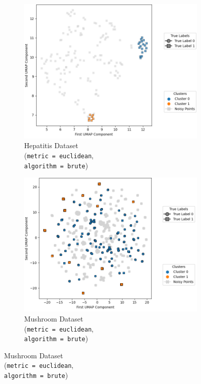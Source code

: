 \begin{figure}[H]
	\centering
	\begin{subfigure}{0.32\textwidth}
		\centering
		\includegraphics[width=\linewidth]{figures/Optics/hepatitis/br-umap.png}
		\caption{Hepatitis Dataset \\ (\texttt{metric = euclidean}, \\ \texttt{algorithm = brute})}
	\end{subfigure}
	\hfill
	\begin{subfigure}{0.32\textwidth}
		\centering
		\includegraphics[width=\linewidth]{figures/Optics/mushroom/br-umap.png}
		\caption{Mushroom Dataset \\ (\texttt{metric = euclidean}, \\ \texttt{algorithm = brute})}

\end{subfigure}
\end{figure}
